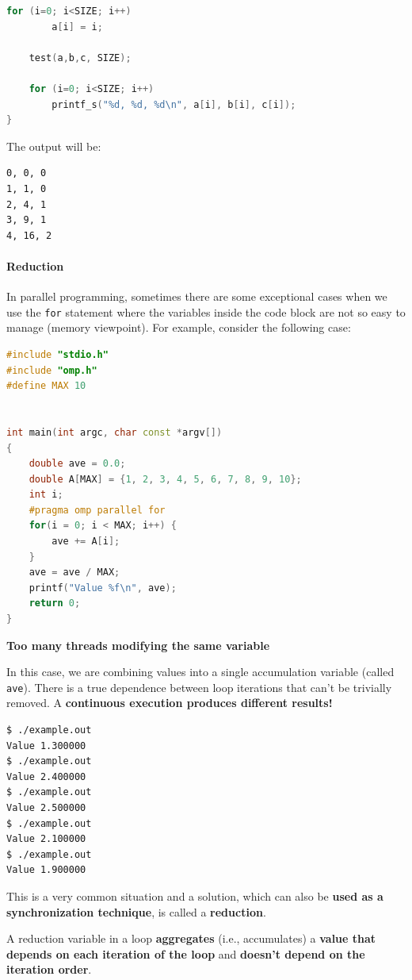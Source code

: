 \begin{itemize}
\begin{examplebox}
\begin{lstlisting}[language=C++]
    for (i=0; i<SIZE; i++)
        a[i] = i;

    test(a,b,c, SIZE);

    for (i=0; i<SIZE; i++)
        printf_s("%d, %d, %d\n", a[i], b[i], c[i]);
}\end{lstlisting}
    The output will be:
\begin{lstlisting}
0, 0, 0
1, 1, 0
2, 4, 1
3, 9, 1
4, 16, 2\end{lstlisting}
    \end{examplebox}
\end{itemize}

\newpage

\paragraph{Reduction}

\noindent
In parallel programming, sometimes there are some exceptional cases when we use the \texttt{for} statement where the variables inside the code block are not so easy to manage (memory viewpoint). For example, consider the following case:
\begin{center}
\begin{lstlisting}[language=C++]
#include "stdio.h"
#include "omp.h"
#define MAX 10


int main(int argc, char const *argv[])
{
    double ave = 0.0;
    double A[MAX] = {1, 2, 3, 4, 5, 6, 7, 8, 9, 10};
    int i;
    #pragma omp parallel for
    for(i = 0; i < MAX; i++) {
        ave += A[i];
    }
    ave = ave / MAX;
    printf("Value %f\n", ave);
    return 0;
}
\end{lstlisting}
\textcolor{Red2}{ \textbf{Too many threads modifying the same variable}}
\end{center}
In this case, we are combining values into a single accumulation variable (called \texttt{ave}). There is a true dependence between loop iterations that can't be trivially removed. A \textbf{continuous execution produces different results!}
\begin{lstlisting}[language=bash, mathescape=false]
$ ./example.out
Value 1.300000
$ ./example.out
Value 2.400000
$ ./example.out 
Value 2.500000
$ ./example.out 
Value 2.100000
$ ./example.out 
Value 1.900000    
\end{lstlisting}
This is a very common situation and a solution, which can also be \textbf{used as a synchronization technique}, is called a \textbf{reduction}.

\highspace
A reduction variable in a loop \textbf{aggregates} (i.e., accumulates) a \textbf{value that depends on each iteration of the loop} and \textbf{doesn't depend on the iteration order}.

